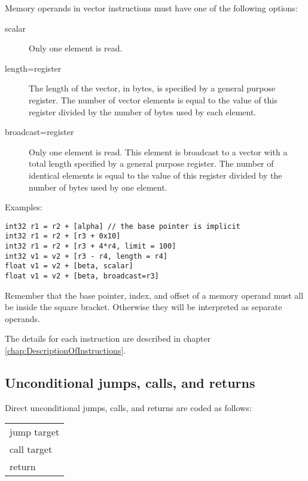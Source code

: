 \documentclass[forwardcom.tex]{subfiles}
\begin{document}
Memory operands in vector instructions must have one of the following options:

\begin{description}

\item[scalar]
Only one element is read.

\item[length=register]
The length of the vector, in bytes, is specified by a general purpose register. 
The number of vector elements is equal to the value of this register divided by the number of bytes used by each element.

\item[broadcast=register]
Only one element is read. This element is broadcast to a vector with a total length specified by a general purpose register. The number of identical elements is equal to the value of this register divided by the number of bytes used by one element.

\end{description}
\vspace{4mm}


Examples:
\vv

\begin{lstlisting}[frame=single]
int32 r1 = r2 + [alpha] // the base pointer is implicit
int32 r1 = r2 + [r3 + 0x10]
int32 r1 = r2 + [r3 + 4*r4, limit = 100]
int32 v1 = v2 + [r3 - r4, length = r4]
float v1 = v2 + [beta, scalar]
float v1 = v2 + [beta, broadcast=r3]
\end{lstlisting}
\vv

Remember that the base pointer, index, and offset of a memory operand must all be inside the square bracket. Otherwise they will be interpreted as separate operands.
\vv

The details for each instruction are described in chapter \ref{chap:DescriptionOfInstructions}.
\vv


\subsection{Unconditional jumps, calls, and returns} \label{assemblyJumps}
Direct unconditional jumps, calls, and  returns are coded as follows:
\vv

\begin{tabular}{|p{140mm}|}
\hline
\hspace{4mm} jump target\\
\hspace{4mm} call target\\
\hspace{4mm} return\\
\hline
\end{tabular}
\vv
\end{document}
